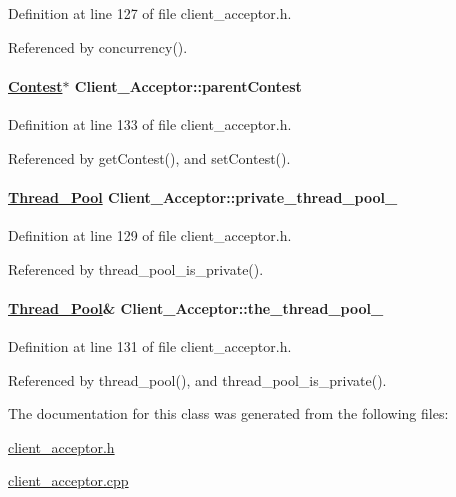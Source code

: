 Definition at line 127 of file client\_\-acceptor.h.

Referenced by concurrency().\hypertarget{classClient__Acceptor_Client__Acceptorn3}{
\paragraph[parentContest]{\setlength{\rightskip}{0pt plus 5cm}\hyperlink{classContest}{Contest}$\ast$ Client\_\-Acceptor::parent\-Contest}\hfill}
\label{classClient__Acceptor_Client__Acceptorn3}




Definition at line 133 of file client\_\-acceptor.h.

Referenced by get\-Contest(), and set\-Contest().\hypertarget{classClient__Acceptor_Client__Acceptorn1}{
\paragraph[private\_\-thread\_\-pool\_\-]{\setlength{\rightskip}{0pt plus 5cm}\hyperlink{classThread__Pool}{Thread\_\-Pool} Client\_\-Acceptor::private\_\-thread\_\-pool\_\-}\hfill}
\label{classClient__Acceptor_Client__Acceptorn1}




Definition at line 129 of file client\_\-acceptor.h.

Referenced by thread\_\-pool\_\-is\_\-private().\hypertarget{classClient__Acceptor_Client__Acceptorn2}{
\paragraph[the\_\-thread\_\-pool\_\-]{\setlength{\rightskip}{0pt plus 5cm}\hyperlink{classThread__Pool}{Thread\_\-Pool}\& Client\_\-Acceptor::the\_\-thread\_\-pool\_\-}\hfill}
\label{classClient__Acceptor_Client__Acceptorn2}




Definition at line 131 of file client\_\-acceptor.h.

Referenced by thread\_\-pool(), and thread\_\-pool\_\-is\_\-private().

The documentation for this class was generated from the following files:\begin{CompactItemize}
\item 
\hyperlink{client__acceptor_8h}{client\_\-acceptor.h}\item 
\hyperlink{client__acceptor_8cpp}{client\_\-acceptor.cpp}\end{CompactItemize}

